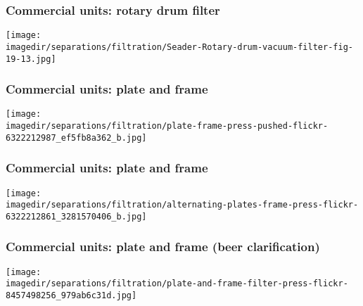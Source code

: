 \begin{frame}\frametitle{Commercial units: rotary drum filter}
	\begin{center}
		\texttt{[image: \\imagedir/separations/filtration/Seader-Rotary-drum-vacuum-filter-fig-19-13.jpg]}
	\end{center}
	\vspace{-6pt}
\end{frame}

\begin{frame}\frametitle{Commercial units: plate and frame}
	\begin{center}
		\texttt{[image: \\imagedir/separations/filtration/plate-frame-press-pushed-flickr-6322212987\_ef5fb8a362\_b.jpg]}
	\end{center}
\end{frame}

\begin{frame}\frametitle{Commercial units: plate and frame}
	\begin{center}
		\texttt{[image: \\imagedir/separations/filtration/alternating-plates-frame-press-flickr-6322212861\_3281570406\_b.jpg]}
	\end{center}
\end{frame}

\begin{frame}\frametitle{Commercial units: plate and frame (beer clarification)}
	\begin{center}
		\texttt{[image: \\imagedir/separations/filtration/plate-and-frame-filter-press-flickr-8457498256\_979ab6c31d.jpg]}
	\end{center}
\end{frame}

